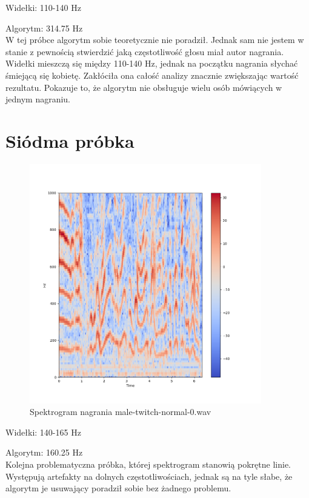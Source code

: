 \documentclass[a4paper,12pt]{extarticle}
\begin{document}
\noindent Widełki: 110-140 Hz

\noindent Algorytm: 314.75 Hz\\

\noindent W tej próbce algorytm sobie teoretycznie nie poradził. Jednak sam nie jestem w stanie z pewnością stwierdzić jaką częstotliwość głosu miał autor nagrania. Widełki mieszczą się między 110-140 Hz, jednak na początku nagrania słychać śmiejącą się kobietę. Zakłóciła ona całość analizy znacznie zwiększając wartość rezultatu. Pokazuje to, że algorytm nie obsługuje wielu osób mówiących w jednym nagraniu.

\clearpage

\section*{Siódma próbka}

\begin{figure}[h!]
\centering
\includegraphics[width=0.9\textwidth]{male-twitch-normal-0}
\caption{Spektrogram nagrania male-twitch-normal-0.wav}
\end{figure}

\noindent Widełki: 140-165 Hz

\noindent Algorytm: 160.25 Hz\\

\noindent Kolejna problematyczna próbka, której spektrogram stanowią pokrętne linie. Występują artefakty na dolnych częstotliwościach, jednak są na tyle słabe, że algorytm je usuwający poradził sobie bez żadnego problemu.
\end{document}

